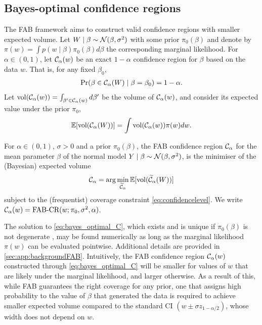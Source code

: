 \subsection{Bayes-optimal confidence regions}\label{sec:background_fab}
The FAB framework \citep{Pratt1961,Pratt1963,Yu2018} aims to construct valid confidence regions with smaller expected volume.
Let $W\mid \beta\sim\mathcal N(\beta,\sigma^2)$ with some prior $\pi_0(\beta)$ and denote by $\pi(w)=\int p(w\mid \beta) \pi_0(\beta)d\beta$ the corresponding marginal likelihood.
For $\alpha\in(0,1)$, let $\mathcal C_\alpha(w)$ be an exact $1-\alpha$ confidence region for $\beta$ based on the data $w$. That is,
for any fixed $\beta_0$,
\begin{align}
    \Pr(\beta\in \mathcal C_\alpha(W)\mid \beta=\beta_0)=1-\alpha. \label{eq:confidencelevel}
\end{align}
Let $\mathrm{vol}(\mathcal C_\alpha(w))=\int_{\beta'\in\mathcal C_\alpha(w)}d\beta'$ be the volume of $\mathcal C_\alpha(w)$, and consider its expected value under the prior $\pi_0$,
\begin{equation}
    \mathbb E[\mathrm{vol}(\mathcal C_\alpha(W))] = \int \mathrm{vol}(\mathcal C_\alpha(w)) \pi(w) dw.
\end{equation}
\begin{definition}
    For $\alpha\in(0,1)$, $\sigma>0$ and a prior $\pi_0(\beta)$, the FAB confidence region $\mathcal C_\alpha$ for the mean parameter $\beta$ of the normal model $Y\mid\beta\sim\mathcal N(\beta,\sigma^2)$, is the minimiser of the (Bayesian) expected volume
    \begin{align}
        \mathcal C_\alpha = \arg\min_{\widetilde{\mathcal C}_\alpha} \mathbb E[\mathrm{vol}(\widetilde{\mathcal C}_\alpha(W))] \label{eq:bayes_optimal_C}
    \end{align}
    subject to the (frequentist) coverage constraint \eqref{eq:confidencelevel}. We write $\mathcal C_\alpha(w)=\text{FAB-CR}(w;\pi_0,\sigma^2,\alpha)$.
\end{definition}
The solution to \cref{eq:bayes_optimal_C}, which exists and is unique if $\pi_0(\beta)$ is not degenerate \citep[Theorem~2.1]{Cortinovis2024}, may be found numerically as long as the marginal likelihood $\pi(w)$ can be evaluated pointwise.
Additional details are provided in \cref{sec:app:backgroundFAB}.
Intuitively, the FAB confidence region $\mathcal C_\alpha(w)$ constructed through \cref{eq:bayes_optimal_C} will be smaller for values of $w$ that are likely under the marginal likelihood, and larger otherwise.
As a result of this, while FAB guarantees the right coverage for any prior, one that assigns high probability to the value of $\beta$ that generated the data is required to achieve smaller expected volume compared to the standard CI $(w\pm \sigma z_{1-\alpha/2})$, whose width does not depend on $w$.


